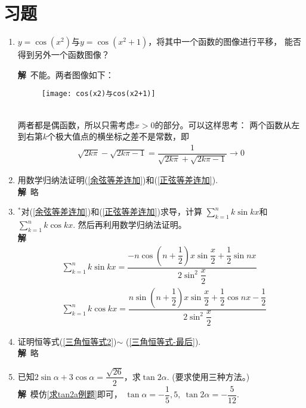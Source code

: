\section{习题}
\begin{enumerate}[label={\textbf{\arabic*.}},leftmargin=
    \inteval{\myenumleftmargin}pt]
\item $ y=\cos(x^2) $与$ y=\cos(x^2+1) $，将其中一个函数的图像进行平移，
能否得到另外一个函数图像？

\textbf{解}\ 不能。两者图像如下：
\begin{figure}[h]
    \centering
    \texttt{[image: cos(x2)与cos(x2+1)]}
\end{figure} \\
两者都是偶函数，所以只需考虑$ x>0 $的部分。可以这样思考：
两个函数从左到右第$ k $个极大值点的横坐标之差不是常数，即
\begin{gather*}
    \sqrt{2k\pi}-\sqrt{2k\pi-1}=\dfrac{1}{\sqrt{2k\pi}+\sqrt{2k\pi-1}}\to 0
\end{gather*}
    
\item 用数学归纳法证明(\ref{余弦等差连加})和(\ref{正弦等差连加}).   
\ifteach \\ \textbf{解}\ 略
\fi

\item $ ^* $对(\ref{余弦等差连加})和(\ref{正弦等差连加})求导，计算
$ \sum\limits_{k=1}^{n}k\sin kx $和$ \sum\limits_{k=1}^{n}k\cos kx $. 
然后再利用数学归纳法证明。
\ifteach \\ \textbf{解}\ 
\begin{align*}
    &\sum_{k=1}^{n}k\sin kx=\dfrac{-n\cos(n+\dfrac{1}{2})x\sin\dfrac{x}{2}+
        \dfrac{1}{2}\sin nx}{2\sin^2 \dfrac{x}{2}} \\
    &\sum_{k=1}^{n}k\cos kx=\dfrac{n\sin(n+\dfrac{1}{2})x\sin\dfrac{x}{2}+
        \dfrac{1}{2}\cos nx - \dfrac{1}{2}}{2\sin^2 \dfrac{x}{2}} 
\end{align*}
\fi

\item 证明恒等式(\ref{三角恒等式2})$ \sim $ (\ref{三角恒等式-最后}).
\ifteach \\ \textbf{解}\ 略
\fi

\item 已知$ 2\sin\alpha+3\cos\alpha=\dfrac{\sqrt{26}}{2} $，求$ \tan2\alpha $.
(要求使用三种方法。)
\ifteach \\ \textbf{解}\ 模仿\ref{求tan2a例题}即可，
$ \tan\alpha=-\dfrac{1}{5},5,\ \tan2\alpha=-\dfrac{5}{12} $.  
\fi


\end{enumerate}
